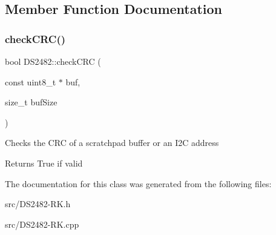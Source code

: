\subsection{Member Function Documentation}
\mbox{\label{class_d_s2482_af67372aa2f9fa896f46ca4766104cea0}} 
\subsubsection{\texorpdfstring{check\+C\+R\+C()}{checkCRC()}}
{\footnotesize\ttfamily bool D\+S2482\+::check\+C\+RC (\begin{DoxyParamCaption}\item[{const uint8\+\_\+t $\ast$}]{buf,  }\item[{size\+\_\+t}]{buf\+Size }\end{DoxyParamCaption})\hspace{0.3cm}{\ttfamily [static]}}

Checks the C\+RC of a scratchpad buffer or an I2C address

\begin{DoxyReturn}{Returns}
True if valid 
\end{DoxyReturn}


The documentation for this class was generated from the following files\+:\begin{DoxyCompactItemize}
\item 
src/D\+S2482-\/\+R\+K.\+h\item 
src/D\+S2482-\/\+R\+K.\+cpp\end{DoxyCompactItemize}
